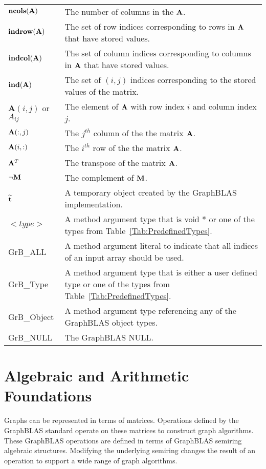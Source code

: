 \begin{tabular}[H]{l|p{5in}}
$\mathbf{ncols}({\bf A})$ & The number of columns in the ${\bf A}$.\\
$\mathbf{indrow}({\bf A})$ & The set of row indices corresponding to rows in ${\bf A}$ that have stored values.  \\
$\mathbf{indcol}({\bf A})$ & The set of column indices corresponding to columns in ${\bf A}$ that have stored values. \\
$\mathbf{ind}({\bf A})$ & The set of $(i,j)$ indices corresponding to the stored values of the matrix. \\
$\mathbf{A}(i,j)$ or $A_{ij}$ & The element of ${\bf A}$ with row index $i$ and column index $j$.\\
${\bf A}(:,j)$ & The $j^{th}$ column of the the matrix ${\bf A}$.\\
${\bf A}(i,:)$ & The $i^{th}$ row of the the matrix ${\bf A}$.\\
${\bf A}^T$ &The transpose of the matrix ${\bf A}$. \\
$\neg{\bf M}$ & The complement of ${\bf M}$.\\
${\bf \widetilde{t}}$ & A temporary object created  by the GraphBLAS implementation. \\
$<type>$ & A method argument type that is {\sf void *} or one of the types from Table~\ref{Tab:PredefinedTypes}. \\
{\sf GrB\_ALL} & A method argument literal to indicate that all indices of an input array should be used.\\
{\sf GrB\_Type} & A method argument type that is either a user defined type or one of the  types from Table~\ref{Tab:PredefinedTypes}.\\
{\sf GrB\_Object} &  A method argument type referencing any of the GraphBLAS object types.\\
{\sf GrB\_NULL} & The GraphBLAS NULL.\\
\end{tabular}

\restoregeometry


\section{Algebraic and Arithmetic Foundations}

Graphs can be represented in terms of matrices. Operations defined by the GraphBLAS standard
operate on these matrices to construct graph algorithms.
These GraphBLAS operations are defined in terms of GraphBLAS semiring algebraic 
structures. Modifying the underlying semiring changes the result of 
an operation to support a wide range of graph algorithms.

